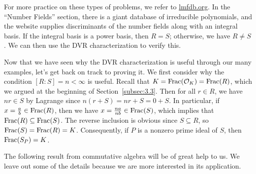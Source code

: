 For more practice on these types of problems, we refer to \href{lmfdb.org}{lmfdb.org}. 
In the ``Number Fields'' section, there is a giant database of irreducible polynomials, 
and the website supplies discriminants of the number fields along with an integral basis. 
If the integral basis is a power basis, then $R = S$; otherwise, we have $R \neq S$.
We can then use the DVR characterization to verify this.

Now that we have seen why the DVR characterization is useful through our many examples, 
let's get back on track to proving it. 
We first consider why the condition $[R : S] = n < \infty$ is useful. Recall that 
$K = \operatorname{Frac}({\cal O}_K) = \operatorname{Frac}(R)$, which we argued at the beginning of Section~\ref{subsec:3.3}. 
Then for all $r \in R$, we have $nr \in S$ by 
Lagrange since $n(r + S) = nr + S = 0 + S$. In particular, if $x = \frac{a}{b} \in \operatorname{Frac}(R)$, 
then we have $x = \frac{na}{nb} \in \operatorname{Frac}(S)$, which implies that $\operatorname{Frac}(R) \subseteq \operatorname{Frac}(S)$. 
The reverse inclusion is obvious since $S \subseteq R$, so $\operatorname{Frac}(S) = \operatorname{Frac}(R) = K$. 
Consequently, if $P$ is a nonzero prime ideal of $S$, then $\operatorname{Frac}(S_P) = K$.

The following result from commutative algebra will be of great help to us. We leave out 
some of the details because we are more interested in its application. 

